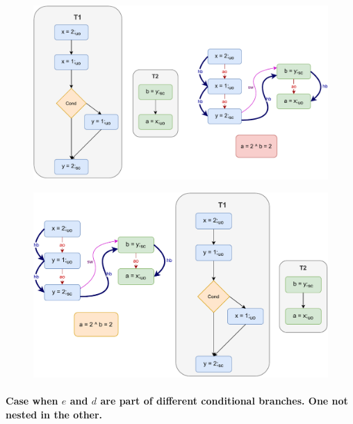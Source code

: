             \begin{figure}
                \centering 
                \includegraphics[scale=0.7]{InstructionReordering/CounterExamples2a(Conditionals).pdf}
                \caption{}
            \end{figure}

            \begin{figure}
                \centering 
                \includegraphics[scale=0.7]{InstructionReordering/CounterExamples2b(Conditionals).pdf}
                \caption{}
            \end{figure}

        \paragraph{Case when $e$ and $d$ are part of different conditional branches. One not nested in the other.}


